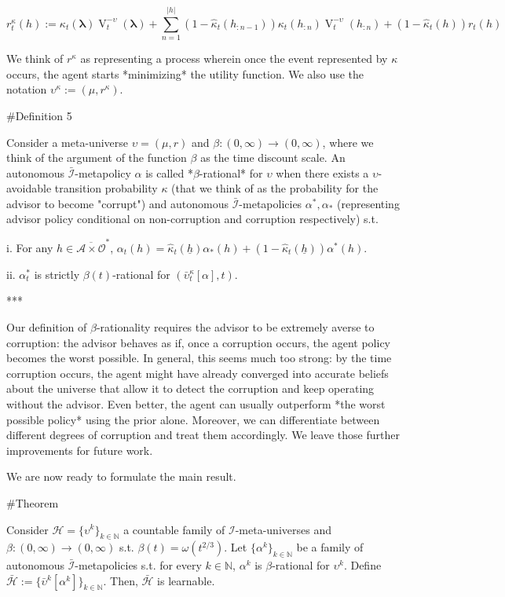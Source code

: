 \documentclass[a4paper]{article}
\newcommand{\Nats}{\mathbb{N}}
\newcommand{\Estr}{\boldsymbol{\lambda}}
\newcommand{\Abs}[1]{\lvert #1 \rvert}
\newcommand{\Ob}{\mathcal{O}}
\newcommand{\A}{\mathcal{A}}
\newcommand{\I}{\mathcal{I}}
\newcommand{\Adi}{\bar{\I}}
\newcommand{\Adao}{\overline{\A \times \Ob}}
\newcommand{\Adfh}{\Adao^*}
\newcommand{\Hy}{\mathcal{H}}
\newcommand{\V}{\operatorname{V}}
\begin{document}
$$r^\kappa_t(h):=\kappa_t(\Estr) \V^{-\upsilon}_t(\Estr)+\sum_{n=1}^{\Abs{h}} (1-\hat{\kappa}_t(h_{:n-1}))\kappa_t(h_{:n}) \V^{-\upsilon}_t(h_{:n})+(1-\hat{\kappa}_t(h))r_t(h)$$

We think of $r^\kappa$ as representing a process wherein once the event represented by $\kappa$ occurs, the agent starts *minimizing* the utility function. We also use the notation $\upsilon^\kappa:=(\mu,r^\kappa)$.

\#Definition 5

Consider a meta-universe $\upsilon=(\mu,r)$ and $\beta: (0,\infty) \rightarrow (0,\infty)$, where we think of the argument of the function $\beta$ as the time discount scale. An autonomous $\Adi$-metapolicy $\alpha$ is called *$\beta$-rational* for $\upsilon$ when there exists a $\upsilon$-avoidable transition probability $\kappa$ (that we think of as the probability for the advisor to become "corrupt") and autonomous $\Adi$-metapolicies $\alpha^*,\alpha_*$ (representing advisor policy conditional on non-corruption and corruption respectively) s.t. 

i. For any $h \in \Adfh$, $\alpha_t(h) = \hat{\kappa}_t(\underline{h}) \alpha_*(h) + (1 - \hat{\kappa}_t(\underline{h}))\alpha^*(h)$.

ii. $\alpha^*_t$ is strictly $\beta(t)$-rational for $(\bar{\upsilon}^\kappa_t[\alpha], t)$.

***

Our definition of $\beta$-rationality requires the advisor to be extremely averse to corruption: the advisor behaves as if, once a corruption occurs, the agent policy becomes the worst possible. In general, this seems much too strong: by the time corruption occurs, the agent might have already converged into accurate beliefs about the universe that allow it to detect the corruption and keep operating without the advisor. Even better, the agent can usually outperform *the worst possible policy* using the prior alone. Moreover, we can differentiate between different degrees of corruption and treat them accordingly. We leave those further improvements for future work.

We are now ready to formulate the main result.

\#Theorem

Consider $\Hy = \{\upsilon^k\}_{k \in \Nats}$ a countable family of $\I$-meta-universes and $\beta: (0,\infty) \rightarrow (0,\infty)$ s.t. $\beta(t) = \omega(t^{2/3})$. Let $\{\alpha^k\}_{k \in \Nats}$ be a family of autonomous $\Adi$-metapolicies s.t. for every $k \in \Nats$, $\alpha^k$ is $\beta$-rational for $\upsilon^k$. Define $\bar{\Hy}:=\{\bar{\upsilon}^k[\alpha^k]\}_{k \in \Nats}$. Then, $\bar{\Hy}$ is learnable.
\end{document}
